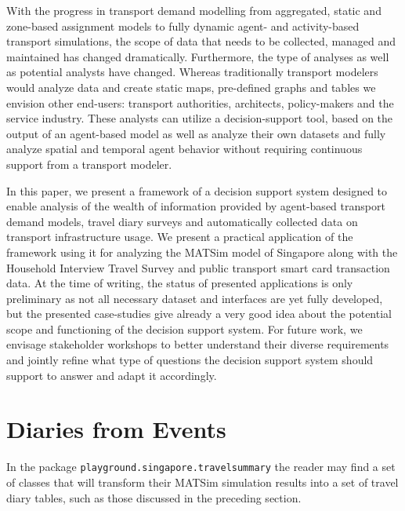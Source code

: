 With the progress in transport demand modelling from aggregated, static and zone-based
assignment models to fully dynamic agent- and activity-based transport simulations, the scope of
data that needs to be collected, managed and maintained has changed dramatically. Furthermore,
the type of analyses as well as potential analysts have changed. Whereas traditionally transport
modelers would analyze data and create static maps, pre-defined graphs and tables we envision
other end-users: transport authorities, architects, policy-makers and the service industry. These
analysts can utilize a decision-support tool, based on the output of an agent-based model as well
as analyze their own datasets and fully analyze spatial and temporal agent behavior without
requiring continuous support from a transport modeler.

In this paper, we present a framework of a decision support system designed to enable analysis
of the wealth of information provided by agent-based transport demand models, travel diary
surveys and automatically collected data on transport infrastructure usage. We present a practical
application of the framework using it for analyzing the MATSim model of Singapore along with
the Household Interview Travel Survey and public transport smart card transaction data. At
the time of writing, the status of presented applications is only preliminary as not all necessary
dataset and interfaces are yet fully developed, but the presented case-studies give already a very
good idea about the potential scope and functioning of the decision support system. For future
work, we envisage stakeholder workshops to better understand their diverse requirements and
jointly refine what type of questions the decision support system should support to answer and
adapt it accordingly.




\citet[][]{ErathEtAl_unpub_EASTS_2013, ErathEtAl_unpub_STRC_2013}

\section{Diaries from Events }
In the package \texttt{playground.singapore.travelsummary} the reader may find a set of classes that will transform their MATSim simulation results into a set of travel diary tables, such as those discussed in the preceding section.





